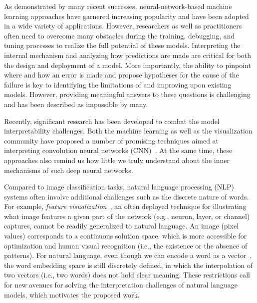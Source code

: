 \maketitle

As demonstrated by many recent successes, neural-network-based machine learning approaches have garnered increasing popularity and have been adopted in a wide variety of applications.
%
However, researchers as well as practitioners often need to overcome many obstacles during the training, debugging, and tuning processes to realize the full potential of these models.
%
Interpreting the internal mechanism and analyzing how predictions are made are critical for both the design and deployment of a model.
More importantly, the ability to pinpoint where and how an error is made and propose hypotheses for the cause of the failure is key to identifying the limitations of and improving upon existing models.
However, providing meaningful answers to these questions is challenging and has been described as impossible by many.

Recently, significant research has been developed to combat the model interpretability challenges.
Both the machine learning as well as the visualization community have proposed a number of promising techniques aimed at interpreting convolution neural networks (CNN)~\cite{SimonyanVedaldiZisserman2013, ZeilerFergus2014, YosinskiCluneNguyen2015, OlahMordvintsevSchubert2017, LiuShiLi2017, OlahSatyanarayanJohnson2018, BilalJourablooYe2018}.
At the same time, these approaches also remind us how little we truly understand about the inner mechanisms of such deep neural networks.

Compared to image classification tasks, natural language processing (NLP) systems often involve additional challenges such as the discrete nature of words.
For example, \emph{feature visualization}~\cite{OlahMordvintsevSchubert2017}, an often deployed technique for illustrating what image features a given part of the network (e.g., neuron, layer, or channel) captures, cannot be readily generalized to natural language.
An image (pixel values) corresponds to a continuous solution space. which is more accessible for optimization and human visual recognition (i.e., the existence or the absence of patterns).
For natural language, even though we can encode a word as a vector~\cite{MikolovSutskeverChen2013, PenningtonSocherManning2014}, the word embedding space is still discretely defined, in which the interpolation of two vectors (i.e., two words) does not hold clear meaning.%
%
These restrictions call for new avenues for solving the interpretation challenges of natural language models, which motivates the proposed work.

